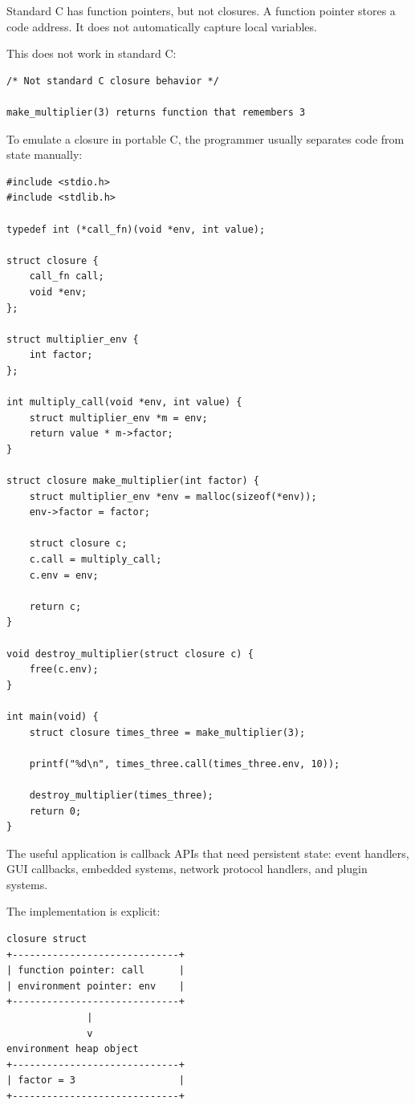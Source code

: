 Standard C has function pointers, but not closures. A function pointer stores a code address. It does not automatically capture local variables.

This does not work in standard C:

\begin{verbatim}
/* Not standard C closure behavior */

make_multiplier(3) returns function that remembers 3
\end{verbatim}

To emulate a closure in portable C, the programmer usually separates code from state manually:

\begin{verbatim}
#include <stdio.h>
#include <stdlib.h>

typedef int (*call_fn)(void *env, int value);

struct closure {
    call_fn call;
    void *env;
};

struct multiplier_env {
    int factor;
};

int multiply_call(void *env, int value) {
    struct multiplier_env *m = env;
    return value * m->factor;
}

struct closure make_multiplier(int factor) {
    struct multiplier_env *env = malloc(sizeof(*env));
    env->factor = factor;

    struct closure c;
    c.call = multiply_call;
    c.env = env;

    return c;
}

void destroy_multiplier(struct closure c) {
    free(c.env);
}

int main(void) {
    struct closure times_three = make_multiplier(3);

    printf("%d\n", times_three.call(times_three.env, 10));

    destroy_multiplier(times_three);
    return 0;
}
\end{verbatim}

The useful application is callback APIs that need persistent state: event handlers, GUI callbacks, embedded systems, network protocol handlers, and plugin systems.

The implementation is explicit:

\begin{verbatim}
closure struct
+-----------------------------+
| function pointer: call      |
| environment pointer: env    |
+-----------------------------+
              |
              v
environment heap object
+-----------------------------+
| factor = 3                  |
+-----------------------------+
\end{verbatim}


